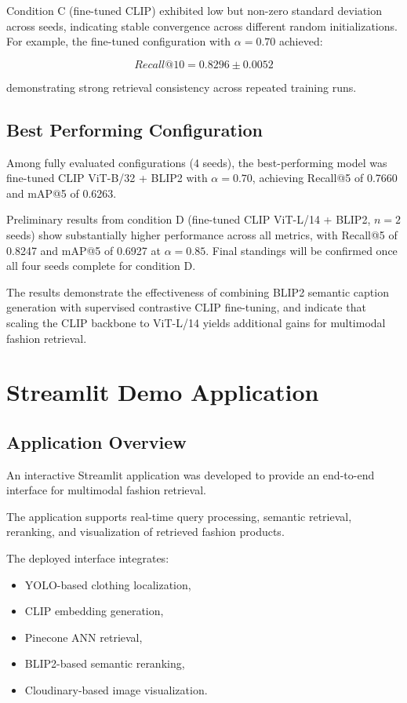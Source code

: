 \documentclass[11pt,a4paper]{article}
\begin{document}
Condition C (fine-tuned CLIP) exhibited low but non-zero standard deviation across seeds, indicating stable convergence across different random initializations. For example, the fine-tuned configuration with $\alpha = 0.70$ achieved:

\[
Recall@10 = 0.8296 \pm 0.0052
\]

demonstrating strong retrieval consistency across repeated training runs.

\subsection{Best Performing Configuration}

Among fully evaluated configurations (4 seeds), the best-performing model was fine-tuned CLIP ViT-B/32 + BLIP2 with $\alpha = 0.70$, achieving Recall@5 of 0.7660 and mAP@5 of 0.6263.

Preliminary results from condition D (fine-tuned CLIP ViT-L/14 + BLIP2, $n=2$ seeds) show substantially higher performance across all metrics, with Recall@5 of 0.8247 and mAP@5 of 0.6927 at $\alpha = 0.85$. Final standings will be confirmed once all four seeds complete for condition D.

The results demonstrate the effectiveness of combining BLIP2 semantic caption generation with supervised contrastive CLIP fine-tuning, and indicate that scaling the CLIP backbone to ViT-L/14 yields additional gains for multimodal fashion retrieval.

\section{Streamlit Demo Application}

\subsection{Application Overview}

An interactive Streamlit application was developed to provide an end-to-end interface for multimodal fashion retrieval.

The application supports real-time query processing, semantic retrieval, reranking, and visualization of retrieved fashion products.

The deployed interface integrates:
\begin{itemize}
    \item YOLO-based clothing localization,
    \item CLIP embedding generation,
    \item Pinecone ANN retrieval,
    \item BLIP2-based semantic reranking,
    \item Cloudinary-based image visualization.
\end{itemize}
\end{document}
